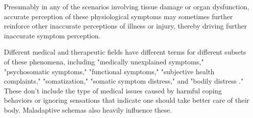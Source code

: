 \documentclass[12pt,letterpaper]{book}
\begin{document}
Presumably in any of the scenarios involving tissue damage or organ dysfunction, accurate perception of these physiological symptoms may sometimes further reinforce other inaccurate perceptions of illness or injury, thereby driving further inaccurate symptom perception.

Different medical and therapeutic fields have different terms for different subsets of these phenomena, including "medically unexplained symptoms," "psychosomatic symptoms," "functional symptoms," "subjective health complaints," "somatization," "somatic symptom distress," and "bodily distress \cite{berghPsychogenic}." These don't include the type of medical issues caused by harmful coping behaviors or ignoring sensations that indicate one should take better care of their body. Maladaptive schemas also heavily influence these.
\end{document}
